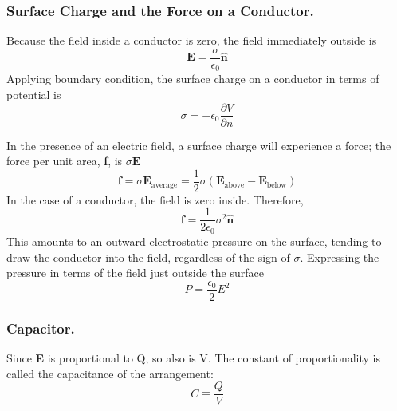 \documentclass[../../../main.tex]{subfiles}
\begin{document}
\subsubsection*{Surface Charge and the Force on a Conductor.} 
Because the field inside a conductor is zero, 
the field immediately outside is
\begin{equation*}
    \mathbf{E}=\frac{\sigma}{\epsilon_0}\mathbf{\hat{n}}
\end{equation*}
Applying boundary condition, the surface charge on a conductor in
terms of potential is
\begin{equation*}
    \sigma=-\epsilon_0\frac{\partial V}{\partial n}
\end{equation*}

In the presence of an electric field, a surface charge will experience a force; the force per unit area, \textbf{f}, is $\sigma\mathbf{E}$
\begin{equation*}
    \mathbf{f}=\sigma\mathbf{E}_{\text{average}}=\frac{1}{2}\sigma(\mathbf{E}_{\text{above}}-\mathbf{E}_{\text{below}})
\end{equation*}
In the case of a conductor, the field is zero inside. Therefore,
    \begin{equation*}
        \mathbf{f}=\frac{1}{2\epsilon_0}\sigma^2\mathbf{\hat{n}}
    \end{equation*} 
This amounts to an outward electrostatic pressure on the surface, tending to draw the conductor into the field, regardless of the sign of $\sigma$. Expressing the pressure in terms of the field just outside the surface
\begin{equation*}
    P=\frac{\epsilon_0}{2}E^2
\end{equation*}

\subsubsection*{Capacitor.}
Since \textbf{E} is proportional to Q, so also is V. The constant of proportionality is called the capacitance of the arrangement:
\begin{equation*}
    C\equiv \frac{Q}{V}
\end{equation*}
\end{document}
